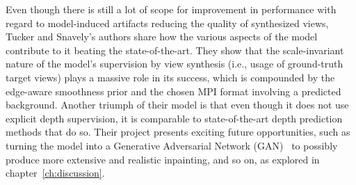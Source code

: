 Even though there is still a lot of scope for improvement in performance with regard to model-induced artifacts reducing the quality of synthesized views, Tucker and Snavely's authors share how the various aspects of the model contribute to it beating the state-of-the-art. They show that the scale-invariant nature of the model's supervision by view synthesis (i.e., usage of ground-truth target views) plays a massive role in its success, which is compounded by the edge-aware smoothness prior and the chosen MPI format involving a predicted background. Another triumph of their model is that even though it does not use explicit depth supervision, it is comparable to state-of-the-art depth prediction methods that do so. Their project presents exciting future opportunities, such as turning the model into a Generative Adversarial Network (GAN)~\cite{goodfellow_generative_2014} to possibly produce more extensive and realistic inpainting, and so on, as explored in chapter~\ref{ch:discussion}.